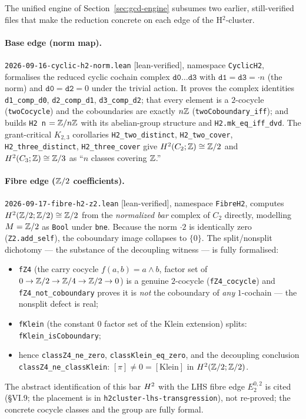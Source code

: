 The unified engine of Section~\ref{sec:gcd-engine} subsumes two earlier, still-verified files that make the reduction concrete on each edge of the H$^2$-cluster.

\paragraph{Base edge (norm map).} \texttt{2026-09-16-cyclic-h2-norm.lean} [lean-verified], namespace \texttt{CyclicH2}, formalises the reduced cyclic cochain complex $\texttt{d0}\dots\texttt{d3}$ with $\texttt{d1}=\texttt{d3}=\cdot n$ (the norm) and $\texttt{d0}=\texttt{d2}=0$ under the trivial action. It proves the complex identities \texttt{d1\_comp\_d0}, \texttt{d2\_comp\_d1}, \texttt{d3\_comp\_d2}; that every element is a $2$-cocycle (\texttt{twoCocycle}) and the coboundaries are exactly $n\mathbb{Z}$ (\texttt{twoCoboundary\_iff}); and builds \texttt{H2 n} $=\mathbb{Z}/n\mathbb{Z}$ with its abelian-group structure and \texttt{H2.mk\_eq\_iff\_dvd}. The grant-critical $K_{2,3}$ corollaries \texttt{H2\_two\_distinct}, \texttt{H2\_two\_cover}, \texttt{H2\_three\_distinct}, \texttt{H2\_three\_cover} give $H^2(C_2;\mathbb{Z})\cong\mathbb{Z}/2$ and $H^2(C_3;\mathbb{Z})\cong\mathbb{Z}/3$ as ``$n$ classes covering $\mathbb{Z}$.''

\paragraph{Fibre edge ($\mathbb{Z}/2$ coefficients).} \texttt{2026-09-17-fibre-h2-z2.lean} [lean-verified], namespace \texttt{FibreH2}, computes $H^2(\mathbb{Z}/2;\mathbb{Z}/2)\cong\mathbb{Z}/2$ from the \emph{normalized bar} complex of $C_2$ directly, modelling $M=\mathbb{Z}/2$ as \texttt{Bool} under \texttt{bne}. Because the norm $\cdot2$ is identically zero (\texttt{Z2.add\_self}), the coboundary image collapses to $\{0\}$. The split/nonsplit dichotomy --- the substance of the decoupling witness --- is fully formalised:
\begin{itemize}
  \item \texttt{fZ4} (the carry cocycle $f(a,b)=a\wedge b$, factor set of $0\to\mathbb{Z}/2\to\mathbb{Z}/4\to\mathbb{Z}/2\to0$) is a genuine $2$-cocycle (\texttt{fZ4\_cocycle}) and \texttt{fZ4\_not\_coboundary} proves it is \emph{not} the coboundary of \emph{any} $1$-cochain --- the nonsplit defect is real;
  \item \texttt{fKlein} (the constant $0$ factor set of the Klein extension) splits: \texttt{fKlein\_isCoboundary};
  \item hence \texttt{classZ4\_ne\_zero}, \texttt{classKlein\_eq\_zero}, and the decoupling conclusion \texttt{classZ4\_ne\_classKlein}: $[\pi]\neq0=[\mathrm{Klein}]$ in $H^2(\mathbb{Z}/2;\mathbb{Z}/2)$.
\end{itemize}
The abstract identification of this bar $H^2$ with the LHS fibre edge $E_2^{0,2}$ is cited (\S VI.9; the placement is in \texttt{h2cluster-lhs-transgression}), not re-proved; the concrete cocycle classes and the group are fully formal.

